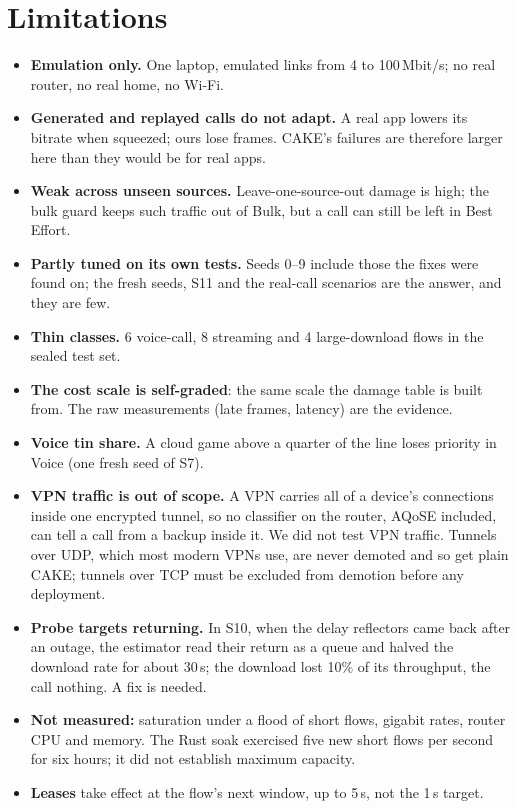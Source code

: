 \documentclass[11pt,a4paper]{article}
\newif\ifnewpage\newpagetrue
\newcommand{\samepagenext}{\global\newpagefalse}
\newcommand{\newpagenext}{\global\newpagetrue}
\begin{document}
\samepagenext
\section{Limitations}\label{sec:limits}
\newpagenext
\begin{itemize}
\item \textbf{Emulation only.} One laptop, emulated links from 4 to 100\,Mbit/s; no real router, no real home, no Wi-Fi.
\item \textbf{Generated and replayed calls do not adapt.} A real app lowers its bitrate when squeezed; ours lose frames. CAKE's failures are therefore larger here than they would be for real apps.
\item \textbf{Weak across unseen sources.} Leave-one-source-out damage is high; the bulk guard keeps such traffic out of Bulk, but a call can still be left in Best Effort.
\item \textbf{Partly tuned on its own tests.} Seeds 0--9 include those the fixes were found on; the fresh seeds, S11 and the real-call scenarios are the answer, and they are few.
\item \textbf{Thin classes.} 6 voice-call, 8 streaming and 4 large-download flows in the sealed test set.
\item \textbf{The cost scale is self-graded}: the same scale the damage table is built from. The raw measurements (late frames, latency) are the evidence.
\item \textbf{Voice tin share.} A cloud game above a quarter of the line loses priority in Voice (one fresh seed of S7).
\item \textbf{VPN traffic is out of scope.} A VPN carries all of a device's connections inside one encrypted tunnel, so no classifier on the router, AQoSE included, can tell a call from a backup inside it. We did not test VPN traffic. Tunnels over UDP, which most modern VPNs use, are never demoted and so get plain CAKE; tunnels over TCP must be excluded from demotion before any deployment.
\item \textbf{Probe targets returning.} In S10, when the delay reflectors came back after an outage, the estimator read their return as a queue and halved the download rate for about 30\,s; the download lost 10\% of its throughput, the call nothing. A fix is needed.
\item \textbf{Not measured:} saturation under a flood of short flows, gigabit rates, router CPU and memory. The Rust soak exercised five new short flows per second for six hours; it did not establish maximum capacity.
\item \textbf{Leases} take effect at the flow's next window, up to 5\,s, not the 1\,s target.
\end{itemize}
\end{document}
